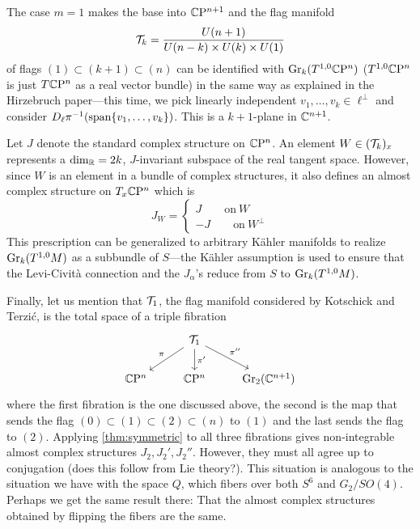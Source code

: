 \documentclass{scrartcl}
\begin{document}
\medskip

The case $m=1$ makes the base into $\mathbb{C}\mathrm{P}^{n+1}$ and the flag manifold
\begin{equation*}
\mathcal{T}_k=\frac{U(n+1)}{U(n-k)\times U(k)\times U(1)}
\end{equation*}
of flags $(1)\subset (k+1)\subset (n)$ can be identified with $\operatorname{Gr}_k(T^{1,0}\mathbb{C}\mathrm{P}^n)$ ($T^{1,0}\mathbb{C}\mathrm{P}^n$ is just $T\mathbb{C}\mathrm{P}^n$ as a real vector bundle) in the same way as explained in the Hirzebruch paper---this time, we pick linearly independent $v_1,\dots,v_k\in \ell^\perp$ and consider $D_\ell \pi^{-1}(\operatorname{span}\{v_1,\dots, v_k\})$. This is a $k+1$-plane in $\mathbb{C}^{n+1}$.

\medskip

Let $J$ denote the standard complex structure on $\mathbb{C}\mathrm{P}^n$. An element $W\in (\mathcal{T}_k)_x$ represents a $\dim_{\mathbb{R}}=2k$, $J$-invariant subspace of the real tangent space. However, since $W$ is an element in a bundle of complex structures, it also defines an almost complex structure on $T_x \mathbb{C}\mathrm{P}^n$ which is
\begin{equation*}
J_W=
\begin{cases}
J\qquad \text{on}\ W\\
-J\qquad \text{on}\ W^\perp
\end{cases}
\end{equation*}
This prescription can be generalized to arbitrary K\"{a}hler manifolds to realize $\operatorname{Gr}_k(T^{1,0}M)$ as a subbundle of $S$---the K\"{a}hler assumption is used to ensure that the Levi-Civit\`{a} connection and the $J_\alpha$'s reduce from $S$ to $\operatorname{Gr}_k(T^{1,0}M)$. 

\medskip

Finally, let us mention that $\mathcal{T}_1$, the flag manifold considered by Kotschick and Terzi\'{c}, is the total space of a triple fibration
\begin{equation*}
\begin{tikzcd}
& \mc T_1 \ar[dl,"\pi"'] \ar[d,"\pi'"] \ar[dr,"\pi''"] \\
\CP^n & \CP^n & \Gr_2(\C^{n+1})
\end{tikzcd}
\end{equation*}
where the first fibration is the one discussed above, the second is the map that sends the flag $(0)\subset(1)\subset (2)\subset (n)$ to $(1)$ and the last sends the flag to $(2)$. Applying \cref{thm:symmetric} to all three fibrations gives non-integrable almost complex structures $J_2,J_2',J_2''$. However, they must all agree up to conjugation (does this follow from Lie theory?). This situation is analogous to the situation we have with the space $Q$, which fibers over both $S^6$ and $G_2/SO(4)$. Perhaps we get the same result there: That the almost complex structures obtained by flipping the fibers are the same.
\end{document}

